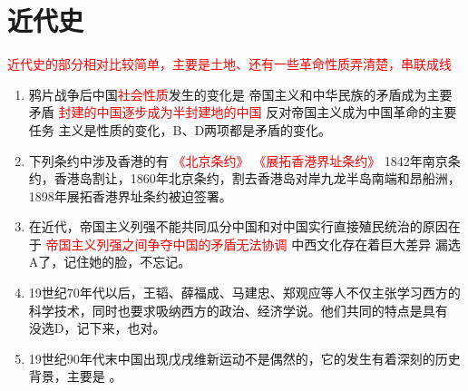 \section{近代史}

\textcolor{red}{\faBook 近代史的部分相对比较简单，主要是土地、还有一些革命性质弄清楚，串联成线}


\begin{enumerate}[align=hang, start=1]
	
	\item 鸦片战争后中国\textcolor{red}{社会性质}发生的变化是	
	\xx{\textcolor{red}{ 独立的中国逐步成为半殖半封的中国 }} { 帝国主义和中华民族的矛盾成为主要矛盾 }  { \textcolor{red}{ 封建的中国逐步成为半封建地的中国 }  } {  反对帝国主义成为中国革命的主要任务 } 
	\note  主义是性质的变化，B、D两项都是矛盾的变化。
	
	\item 下列条约中涉及香港的有 
	 { \textcolor{red}{ 《北京条约》}} {\textcolor{red}{《展拓香港界址条约》}}
 	\note 1842年南京条约，香港岛割让，1860年北京条约，割去香港岛对岸九龙半岛南端和昂船洲，1898年展拓香港界址条约被迫签署。
 	
 	\item 在近代，帝国主义列强不能共同瓜分中国和对中国实行直接殖民统治的原因在于
 	\xx{   	\textcolor{red}{   中国长期以来一直是一个统一的大国 } }{   	\textcolor{red}{   中国人民顽强、持久的反抗}    }  {     	\textcolor{red}{ 帝国主义列强之间争夺中国的矛盾无法协调  } }  {  中西文化存在着巨大差异  } 
 	\note 漏选A了，记住她的脸，不忘记。  
 	
 	\item 
 	19世纪70年代以后，王韬、薛福成、马建忠、郑观应等人不仅主张学习西方的科学技术，同时也要求吸纳西方的政治、经济学说。他们共同的特点是具有
	\note 没选D，记下来，也对。
	
	\item 
	19世纪90年代末中国出现戊戌维新运动不是偶然的，它的发生有着深刻的历史背景，主要是
	\note {}。
	

\end{enumerate}
